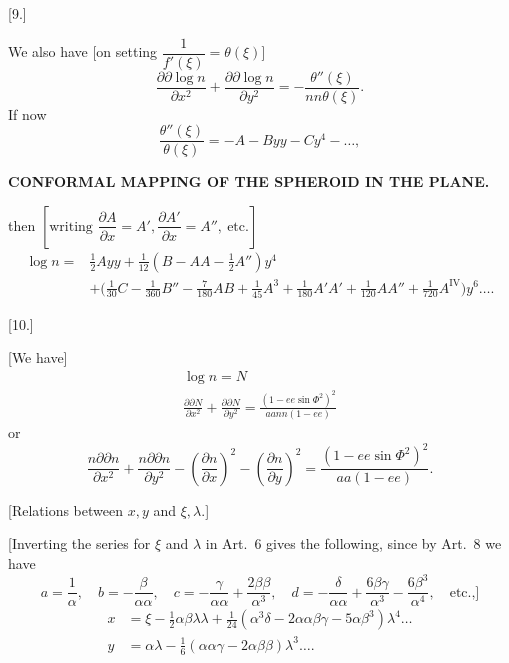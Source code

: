 \begin{center}[9.]\end{center}
We also have [on setting \(\dfrac{1}{f'(\xi)}=\theta(\xi)\)]
\[
\frac{\partial\partial\log n}{\partial x^2}+\frac{\partial\partial\log n}{\partial y^2}
=-\frac{\theta''(\xi)}{nn\theta(\xi)}.
\]
If now
\[
\frac{\theta''(\xi)}{\theta(\xi)}=-A-Byy-Cy^4-\ldots,
\]

\par\clearpage
\noindent\null\hfill{\small\textbf{CONFORMAL MAPPING OF THE SPHEROID IN THE PLANE.}}\hfill{}\par\medskip

\noindent then \(\left[\text{writing }\dfrac{\partial A}{\partial x}=A',
\dfrac{\partial A'}{\partial x}=A'',\ \text{etc.}\right]\)
\[
\begin{aligned}
\log n={}&\tfrac12Ayy+\tfrac1{12}(B-AA-\tfrac12 A'')y^4\\
 &+\bigl(\tfrac1{30}C-\tfrac1{360}B''-\tfrac7{180}AB+\tfrac1{45}A^3
 +\tfrac1{180}A'A'+\tfrac1{120}AA''+\tfrac1{720}A^{\mathrm{IV}}\bigr)y^6\ldots.
\end{aligned}
\]

\begin{center}[10.]\end{center}
[We have]
\[
\begin{gathered}
\log n=N\\
\frac{\partial\partial N}{\partial x^2}+\frac{\partial\partial N}{\partial y^2}
=\frac{(1-ee\sin\Phi^2)^2}{aann(1-ee)}
\end{gathered}
\]
\noindent or
\[
\frac{n\partial\partial n}{\partial x^2}+\frac{n\partial\partial n}{\partial y^2}
-\left(\frac{\partial n}{\partial x}\right)^2-\left(\frac{\partial n}{\partial y}\right)^2
=\frac{(1-ee\sin\Phi^2)^2}{aa(1-ee)}.
\]

\begin{center}
[Relations between \(x,y\) and \(\xi,\lambda\).]\par\medskip
[11.]
\end{center}
[Inverting the series for \(\xi\) and \(\lambda\) in Art.\ 6 gives the following, since by Art.\ 8 we have
\[
a=\frac1\alpha,\quad b=-\frac{\beta}{\alpha\alpha},\quad
c=-\frac{\gamma}{\alpha\alpha}+\frac{2\beta\beta}{\alpha^3},\quad
d=-\frac{\delta}{\alpha\alpha}+\frac{6\beta\gamma}{\alpha^3}
-\frac{6\beta^3}{\alpha^4},\quad\text{etc.,]}
\]
\[
\begin{aligned}
x&=\xi-\tfrac12\alpha\beta\lambda\lambda
+\tfrac1{24}(\alpha^3\delta-2\alpha\alpha\beta\gamma-5\alpha\beta^3)\lambda^4\ldots\\
y&=\alpha\lambda-\tfrac16(\alpha\alpha\gamma-2\alpha\beta\beta)\lambda^3\ldots.
\end{aligned}
\]

